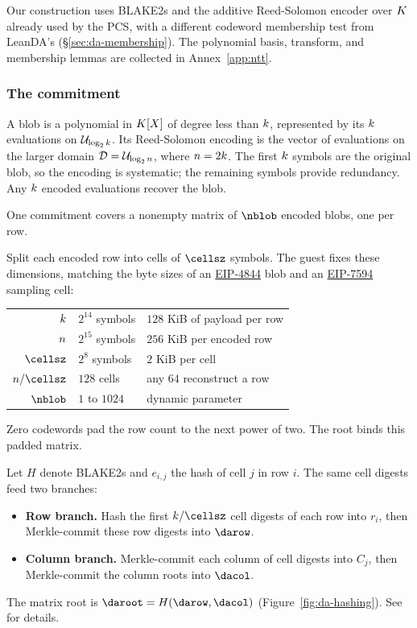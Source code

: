 Our construction uses BLAKE2s and the additive Reed-Solomon encoder over $K$ already used by the PCS, with a different codeword membership test from LeanDA's (\S\ref{sec:da-membership}). The polynomial basis, transform, and membership lemmas are collected in Annex~\ref{app:ntt}.


\subsubsection{The commitment}\label{sec:da-commit}

A blob is a polynomial in $K[X]$ of degree less than $k$, represented by its $k$ evaluations on $\mathcal{U}_{\log_2k}$. Its Reed-Solomon encoding is the vector of evaluations on the larger domain $\mathcal{D}=\mathcal{U}_{\log_2n}$, where $n=2k$. The first $k$ symbols are the original blob, so the encoding is systematic; the remaining symbols provide redundancy. Any $k$ encoded evaluations recover the blob.

One commitment covers a nonempty matrix of $\nblob$ encoded blobs, one per row.

Split each encoded row into cells of $\cellsz$ symbols. The guest fixes these dimensions, matching the byte sizes of an \href{https://eips.ethereum.org/EIPS/eip-4844}{EIP-4844} blob and an \href{https://eips.ethereum.org/EIPS/eip-7594}{EIP-7594} sampling cell:
\begin{center}
\begin{tabular}{@{}rll@{}}
\hline
$k$ & $2^{14}$ symbols & $128$ KiB of payload per row\\
$n$ & $2^{15}$ symbols & $256$ KiB per encoded row\\
$\cellsz$ & $2^8$ symbols & $2$ KiB per cell\\
$\blen/\cellsz$ & $128$ cells & any $64$ reconstruct a row\\
$\nblob$ & $1$ to $1024$ & dynamic parameter\\
\hline
\end{tabular}
\end{center}
Zero codewords pad the row count to the next power of two. The root binds this padded matrix.

Let $H$ denote BLAKE2s and $e_{i,j}$ the hash of cell $j$ in row $i$. The same cell digests feed two branches:
\begin{itemize}[itemsep=1pt,topsep=3pt]
\item \textbf{Row branch.} Hash the first $\kdim/\cellsz$ cell digests of each row into $r_i$, then Merkle-commit these row digests into $\darow$.
\item \textbf{Column branch.} Merkle-commit each column of cell digests into $C_j$, then Merkle-commit the column roots into $\dacol$.
\end{itemize}
The matrix root is $\daroot=H(\darow,\dacol)$ (Figure~\ref{fig:da-hashing}). See \cite{LeanDA} for details.

